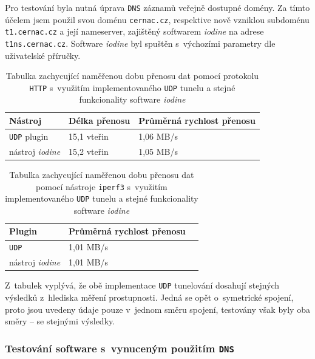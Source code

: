 \documentclass[thesis=M,czech]{FITthesis}[2012/10/20]
\begin{document}
Pro testování byla nutná úprava \texttt{DNS} záznamů veřejně dostupné domény. Za tímto účelem jsem použil svou doménu \texttt{cernac.cz}, respektive nově vzniklou subdoménu \texttt{t1.cernac.cz} a její nameserver, zajištěný softwarem \textit{iodine} na adrese \texttt{t1ns.cernac.cz}. Software \textit{iodine} byl spuštěn s~výchozími parametry dle uživatelské příručky\cite{iodine-repo}.

    \begin{table}[h]
	\centering
	\begin{tabular}{|l||l|l|}
	\hline
	Nástroj & Délka přenosu & Průměrná rychlost přenosu \\ \hline \hline
	\texttt{UDP} plugin         & 15,1 vteřin   & 1,06 MB/s                 \\ \hline
	nástroj \textit{iodine}& 15,2 vteřin   & 1,05 MB/s                 \\ \hline
	\end{tabular}
	\caption{Tabulka zachycující naměřenou dobu přenosu dat pomocí protokolu \texttt{HTTP} s~využitím implementovaného \texttt{UDP} tunelu a stejné funkcionality software \textit{iodine}}
	\label{tab:http-download-iod}
    \end{table}
    
    
    \begin{table}[h]
	\centering
	\begin{tabular}{|l||l|l|}
	\hline
	Plugin   & Průměrná rychlost přenosu \\ \hline \hline
	\texttt{UDP}       & 1,01 MB/s                 \\ \hline
	nástroj \textit{iodine}  & 1,01 MB/s                 \\ \hline
	\end{tabular}
	\caption{Tabulka zachycující naměřenou dobu přenosu dat pomocí nástroje \texttt{iperf3} s~využitím implementovaného \texttt{UDP} tunelu a stejné funkcionality software \textit{iodine}}
	\label{tab:iperf-iod}
    \end{table}
    
     Z~tabulek vyplývá, že obě implementace \texttt{UDP} tunelování dosahují stejných výsledků z~hlediska měření prostupnosti. Jedná se opět o~symetrické spojení, proto jsou uvedeny údaje pouze v~jednom směru spojení, testovány však byly oba směry -- se stejnými výsledky.
     
     
\subsubsection{Testování software s~vynuceným použitím \texttt{DNS}}
\end{document}
